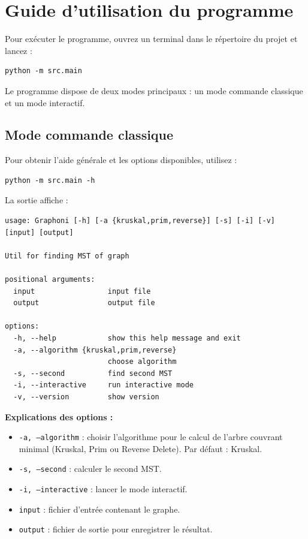 \section{Guide d'utilisation du programme}

Pour exécuter le programme, ouvrez un terminal dans le répertoire du projet et lancez :

\begin{verbatim}
python -m src.main
\end{verbatim}

Le programme dispose de deux modes principaux : un mode commande classique et un mode interactif.

\subsection{Mode commande classique}

Pour obtenir l'aide générale et les options disponibles, utilisez :

\begin{verbatim}
python -m src.main -h
\end{verbatim}

La sortie affiche :

\begin{verbatim}
usage: Graphoni [-h] [-a {kruskal,prim,reverse}] [-s] [-i] [-v] [input] [output]

Util for finding MST of graph

positional arguments:
  input                 input file
  output                output file

options:
  -h, --help            show this help message and exit
  -a, --algorithm {kruskal,prim,reverse}
                        choose algorithm
  -s, --second          find second MST
  -i, --interactive     run interactive mode
  -v, --version         show version
\end{verbatim}

\textbf{Explications des options :}
\begin{itemize}
    \item \texttt{-a, --algorithm} : choisir l'algorithme pour le calcul de l'arbre couvrant minimal (Kruskal, Prim ou Reverse Delete). Par défaut : Kruskal.
    \item \texttt{-s, --second} : calculer le second MST.
    \item \texttt{-i, --interactive} : lancer le mode interactif.
    \item \texttt{input} : fichier d'entrée contenant le graphe.
    \item \texttt{output} : fichier de sortie pour enregistrer le résultat.
\end{itemize}

